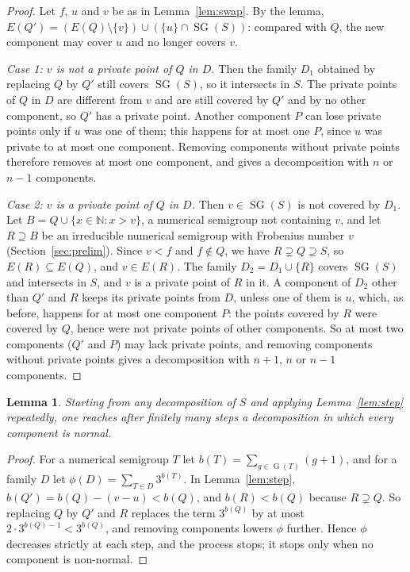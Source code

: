 \documentclass[11pt]{article}
\newtheorem{lemma}{Lemma}
\theoremstyle{definition}
\theoremstyle{remark}
\newcommand{\N}{\mathbb N}
\DeclareMathOperator{\SG}{SG}
\DeclareMathOperator{\G}{G}
\begin{document}
\begin{proof}
Let $f$, $u$ and $v$ be as in Lemma~\ref{lem:swap}. By the lemma,
$E(Q')=(E(Q)\setminus\{v\})\cup(\{u\}\cap\SG(S))$: compared with $Q$, the new
component may cover $u$ and no longer covers $v$.

\emph{Case 1: $v$ is not a private point of $Q$ in $D$.} Then the family
$D_1$ obtained by replacing $Q$ by $Q'$ still covers $\SG(S)$, so it
intersects in $S$. The private points of $Q$ in $D$ are different from $v$
and are still covered by $Q'$ and by no other component, so $Q'$ has a private
point. Another component $P$ can lose private points only if $u$ was one of
them; this happens for at most one $P$, since $u$ was private to at most one
component. Removing components without private points therefore removes at
most one component, and gives a decomposition with $n$ or $n-1$ components.

\emph{Case 2: $v$ is a private point of $Q$ in $D$.} Then $v\in\SG(S)$ is not
covered by $D_1$. Let $B=Q\cup\{x\in\N:x>v\}$, a numerical semigroup not
containing $v$, and let $R\supseteq B$ be an irreducible numerical semigroup
with Frobenius number $v$ (Section~\ref{sec:prelim}). Since $v<f$ and
$f\notin Q$, we have $R\supsetneq Q\supseteq S$, so $E(R)\subseteq E(Q)$, and
$v\in E(R)$. The family $D_2=D_1\cup\{R\}$ covers $\SG(S)$ and intersects in
$S$, and $v$ is a private point of $R$ in it. A component of $D_2$ other than
$Q'$ and $R$ keeps its private points from $D$, unless one of them is $u$,
which, as before, happens for at most one component $P$: the points covered by
$R$ were covered by $Q$, hence were not private points of other components.
So at most two components ($Q'$ and $P$) may lack private points, and removing
components without private points gives a decomposition with $n+1$, $n$ or
$n-1$ components.
\end{proof}

\begin{lemma}\label{lem:terminate}
Starting from any decomposition of $S$ and applying Lemma~\ref{lem:step}
repeatedly, one reaches after finitely many steps a decomposition in which
every component is normal.
\end{lemma}

\begin{proof}
For a numerical semigroup $T$ let $b(T)=\sum_{g\in\G(T)}(g+1)$, and for a
family $D$ let $\phi(D)=\sum_{T\in D}3^{b(T)}$. In Lemma~\ref{lem:step},
$b(Q')=b(Q)-(v-u)<b(Q)$, and $b(R)<b(Q)$ because $R\supsetneq Q$. So
replacing $Q$ by $Q'$ and $R$ replaces the term $3^{b(Q)}$ by at most
$2\cdot3^{b(Q)-1}<3^{b(Q)}$, and removing components lowers $\phi$ further.
Hence $\phi$ decreases strictly at each step, and the process stops; it stops
only when no component is non-normal.
\end{proof}
\end{document}
